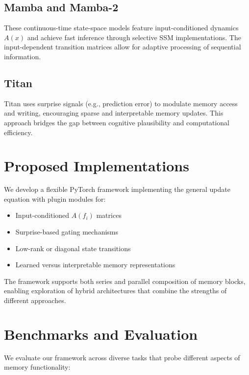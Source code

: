 \documentclass[11pt]{article}
\begin{document}
\subsection{Mamba and Mamba-2}

These continuous-time state-space models feature input-conditioned dynamics $A(x)$ and achieve fast inference through selective SSM implementations. The input-dependent transition matrices allow for adaptive processing of sequential information.

\subsection{Titan}

Titan uses surprise signals (e.g., prediction error) to modulate memory access and writing, encouraging sparse and interpretable memory updates. This approach bridges the gap between cognitive plausibility and computational efficiency.

\section{Proposed Implementations}

We develop a flexible PyTorch framework implementing the general update equation with plugin modules for:
\begin{itemize}
\item Input-conditioned $A(f_i)$ matrices
\item Surprise-based gating mechanisms  
\item Low-rank or diagonal state transitions
\item Learned versus interpretable memory representations
\end{itemize}

The framework supports both series and parallel composition of memory blocks, enabling exploration of hybrid architectures that combine the strengths of different approaches.

\section{Benchmarks and Evaluation}

We evaluate our framework across diverse tasks that probe different aspects of memory functionality:
\end{document}
